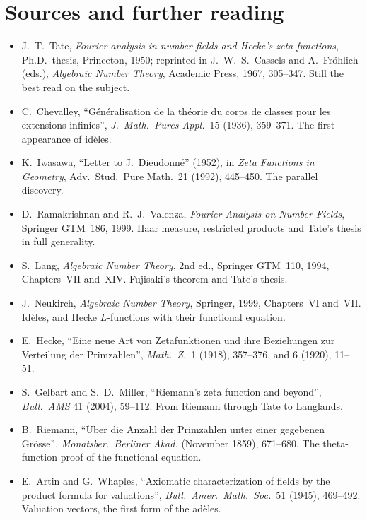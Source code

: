 \section*{Sources and further reading}

\begin{itemize}
\item J.~T.~Tate, \emph{Fourier analysis in number fields and Hecke's zeta-functions}, Ph.D.\ thesis, Princeton, 1950; reprinted in J.~W.~S.~Cassels and
A.~Fr\"ohlich (eds.), \emph{Algebraic Number Theory}, Academic Press, 1967, 305--347. Still the best read on the subject.
\item C.~Chevalley, ``G\'en\'eralisation de la th\'eorie du corps de classes pour les extensions infinies'', \emph{J.\ Math.\ Pures Appl.}\ 15 (1936),
359--371. The first appearance of id\`eles.
\item K.~Iwasawa, ``Letter to J.~Dieudonn\'e'' (1952), in \emph{Zeta Functions in Geometry}, Adv.\ Stud.\ Pure Math.\ 21 (1992), 445--450. The parallel discovery.
\item D.~Ramakrishnan and R.~J.~Valenza, \emph{Fourier Analysis on Number Fields}, Springer GTM~186, 1999. Haar measure, restricted products and Tate's thesis
in full generality.
\item S.~Lang, \emph{Algebraic Number Theory}, 2nd ed., Springer GTM~110, 1994, Chapters~VII and~XIV. Fujisaki's theorem and Tate's thesis.
\item J.~Neukirch, \emph{Algebraic Number Theory}, Springer, 1999, Chapters~VI and~VII. Id\`eles, and Hecke $L$-functions with their functional equation.
\item E.~Hecke, ``Eine neue Art von Zetafunktionen und ihre Beziehungen zur Verteilung der Primzahlen'', \emph{Math.\ Z.}\ 1 (1918), 357--376, and 6 (1920),
11--51.
\item S.~Gelbart and S.~D.~Miller, ``Riemann's zeta function and beyond'', \emph{Bull.\ AMS} 41 (2004), 59--112. From Riemann through Tate to Langlands.
\item B.~Riemann, ``\"Uber die Anzahl der Primzahlen unter einer gegebenen Gr\"osse'', \emph{Monatsber.\ Berliner Akad.}
(November 1859), 671--680. The theta-function proof of the functional equation.
\item E.~Artin and G.~Whaples, ``Axiomatic characterization of fields by the product formula for valuations'', \emph{Bull.\ Amer.\ Math.\ Soc.}\ 51 (1945),
469--492. Valuation vectors, the first form of the ad\`eles.
\end{itemize}
